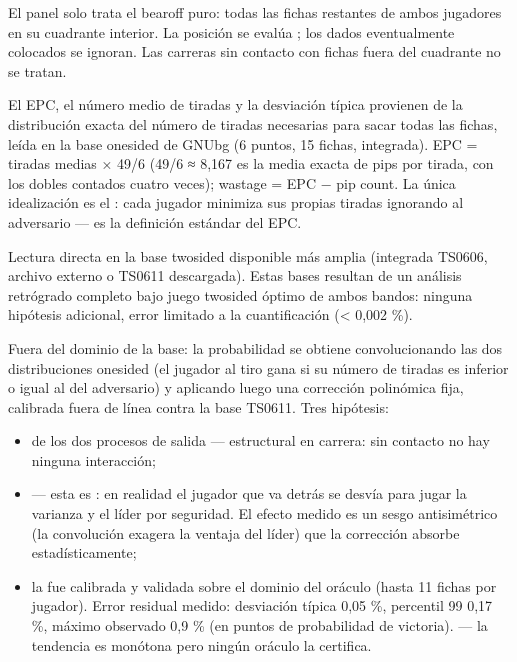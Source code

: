 \documentclass[letterpaper,10pt,spanish]{sphinxmanual}
\begin{document}
\sphinxAtStartPar
{} El panel solo trata el bearoff puro: todas las fichas restantes de ambos jugadores en su cuadrante interior. La posición se evalúa ; los dados eventualmente colocados se ignoran. Las carreras sin contacto con fichas fuera del cuadrante no se tratan.

\sphinxAtStartPar
{} El EPC, el número medio de tiradas y la desviación típica provienen de la distribución exacta del número de tiradas necesarias para sacar todas las fichas, leída en la base one\sphinxhyphen{}sided de GNUbg (6 puntos, 15 fichas, integrada). EPC = tiradas medias × 49/6 (49/6 ≈ 8,167 es la media exacta de pips por tirada, con los dobles contados cuatro veces); wastage = EPC − pip count. La única idealización es el : cada jugador minimiza sus propias tiradas ignorando al adversario — es la definición estándar del EPC.

\sphinxAtStartPar
{} Lectura directa en la base two\sphinxhyphen{}sided disponible más amplia (integrada TS\sphinxhyphen{}06\sphinxhyphen{}06, archivo externo o TS\sphinxhyphen{}06\sphinxhyphen{}11 descargada). Estas bases resultan de un análisis retrógrado completo bajo juego two\sphinxhyphen{}sided óptimo de ambos bandos: ninguna hipótesis adicional, error limitado a la cuantificación (< 0,002 \%).

\sphinxAtStartPar
{} Fuera del dominio de la base: la probabilidad se obtiene convolucionando las dos distribuciones one\sphinxhyphen{}sided (el jugador al tiro gana si su número de tiradas es inferior o igual al del adversario) y aplicando luego una corrección polinómica fija, calibrada fuera de línea contra la base TS\sphinxhyphen{}06\sphinxhyphen{}11. Tres hipótesis:
\begin{itemize}
\item {} 
\sphinxAtStartPar
{} de los dos procesos de salida — estructural en carrera: sin contacto no hay ninguna interacción;

\item {} 
\sphinxAtStartPar
{} — esta es : en realidad el jugador que va detrás se desvía para jugar la varianza y el líder por seguridad. El efecto medido es un sesgo antisimétrico (la convolución exagera la ventaja del líder) que la corrección absorbe estadísticamente;

\item {} 
\sphinxAtStartPar
la  fue calibrada y validada sobre el dominio del oráculo (hasta 11 fichas por jugador). Error residual medido: desviación típica 0,05 \%, percentil 99 0,17 \%, máximo observado 0,9 \% (en puntos de probabilidad de victoria).  — la tendencia es monótona pero ningún oráculo la certifica.

\end{itemize}
\end{document}
